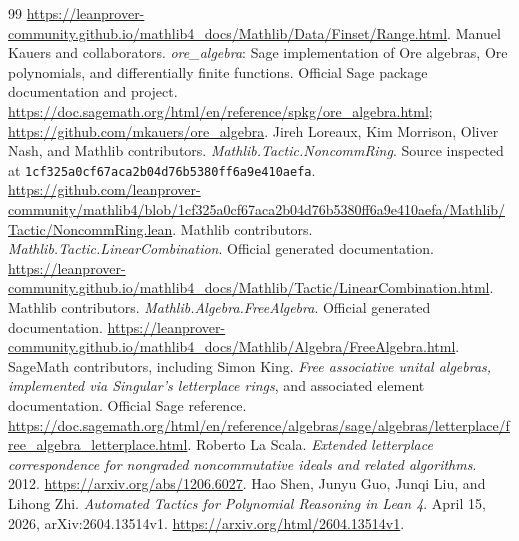 \documentclass[11pt,letterpaper]{article}
\theoremstyle{definition}\newtheorem{definition}[theorem]{Definition}
\theoremstyle{remark}\newtheorem{remark}[theorem]{Remark}
\begin{document}
\begin{thebibliography}{99}
\url{https://leanprover-community.github.io/mathlib4_docs/Mathlib/Data/Finset/Range.html}.
 Manuel Kauers and collaborators. \emph{ore\_algebra}:
Sage implementation of Ore algebras, Ore polynomials, and differentially finite
functions. Official Sage package documentation and project.
\url{https://doc.sagemath.org/html/en/reference/spkg/ore_algebra.html};
\url{https://github.com/mkauers/ore_algebra}.
 Jireh Loreaux, Kim Morrison, Oliver Nash, and Mathlib
contributors. \emph{Mathlib.Tactic.NoncommRing}. Source inspected at
\nolinkurl{1cf325a0cf67aca2b04d76b5380ff6a9e410aefa}.
\url{https://github.com/leanprover-community/mathlib4/blob/1cf325a0cf67aca2b04d76b5380ff6a9e410aefa/Mathlib/Tactic/NoncommRing.lean}.
 Mathlib contributors.
\emph{Mathlib.Tactic.LinearCombination}. Official generated documentation.
\url{https://leanprover-community.github.io/mathlib4_docs/Mathlib/Tactic/LinearCombination.html}.
 Mathlib contributors. \emph{Mathlib.Algebra.FreeAlgebra}.
Official generated documentation.
\url{https://leanprover-community.github.io/mathlib4_docs/Mathlib/Algebra/FreeAlgebra.html}.
 SageMath contributors, including Simon King.
\emph{Free associative unital algebras, implemented via Singular's letterplace
rings}, and associated element documentation. Official Sage reference.
\url{https://doc.sagemath.org/html/en/reference/algebras/sage/algebras/letterplace/free_algebra_letterplace.html}.
 Roberto La Scala. \emph{Extended letterplace
correspondence for nongraded noncommutative ideals and related algorithms}.
2012. \url{https://arxiv.org/abs/1206.6027}.
 Hao Shen, Junyu Guo, Junqi Liu, and Lihong Zhi.
\emph{Automated Tactics for Polynomial Reasoning in Lean 4}. April 15, 2026,
arXiv:2604.13514v1. \url{https://arxiv.org/html/2604.13514v1}.
\end{thebibliography}
\end{document}
